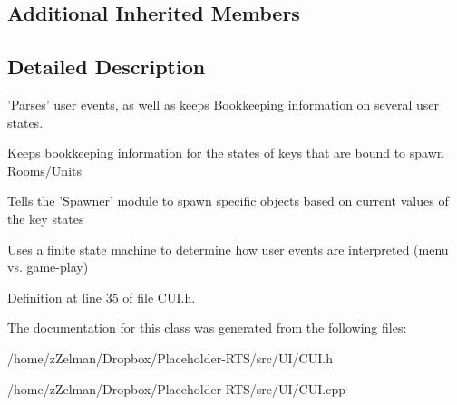 \subsection*{Additional Inherited Members}


\subsection{Detailed Description}
'Parses' user events, as well as keeps Bookkeeping information on several user states.

Keeps bookkeeping information for the states of keys that are bound to spawn Rooms/\-Units

Tells the 'Spawner' module to spawn specific objects based on current values of the key states

Uses a finite state machine to determine how user events are interpreted (menu vs. game-\/play) 

Definition at line 35 of file C\-U\-I.\-h.



The documentation for this class was generated from the following files\-:\begin{DoxyCompactItemize}
\item 
/home/z\-Zelman/\-Dropbox/\-Placeholder-\/\-R\-T\-S/src/\-U\-I/C\-U\-I.\-h\item 
/home/z\-Zelman/\-Dropbox/\-Placeholder-\/\-R\-T\-S/src/\-U\-I/C\-U\-I.\-cpp\end{DoxyCompactItemize}
